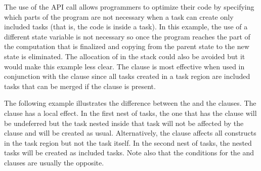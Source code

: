 The use of the  API call allows programmers to optimize 
their code by specifying which parts of the program are not necessary when a task 
can create only included tasks (that is, the code is inside a  task). 
In this example, the use of a different state variable is not necessary so once 
the program reaches the part of the computation that is finalized and copying from 
the parent state to the new state is eliminated. The allocation of  
in the stack could also be avoided but it would make this example less clear. The 
 clause is most effective when used in conjunction with the  
clause since all tasks created in a  task region are included tasks 
that can be merged if the  clause is present.



The following example illustrates the difference between the   and the 
 clauses. The  clause has a local effect. In the first 
nest of tasks, the one that has the   clause will be undeferred but 
the task nested inside that task will not be affected by the  clause 
and will be created as usual. Alternatively, the  clause affects 
all  constructs in the  task region but not the  
task itself. In the second nest of tasks, the nested tasks will be created as included 
tasks. Note also that the conditions for the  and  clauses 
are usually the opposite.



